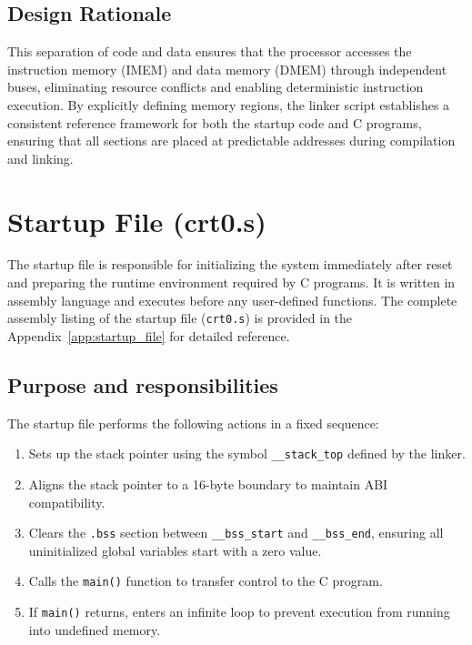 \subsection*{Design Rationale}

This separation of code and data ensures that the processor accesses the instruction memory (IMEM) and data memory (DMEM) through independent buses, eliminating resource conflicts and enabling deterministic instruction execution.  
By explicitly defining memory regions, the linker script establishes a consistent reference framework for both the startup code and C programs, ensuring that all sections are placed at predictable addresses during compilation and linking.


\section{Startup File (crt0.s)}
\label{sec:startup_file}

The startup file is responsible for initializing the system immediately after reset and preparing the runtime environment required by C programs.  
It is written in assembly language and executes before any user-defined functions. The complete assembly listing of the startup file (\texttt{crt0.s}) is provided in the Appendix~\ref{app:startup_file} for detailed reference.


\subsection*{Purpose and responsibilities}

The startup file performs the following actions in a fixed sequence:
\begin{enumerate}
  \item Sets up the stack pointer using the symbol \texttt{\_\_stack\_top} defined by the linker.
  \item Aligns the stack pointer to a 16-byte boundary to maintain ABI compatibility.
  \item Clears the \texttt{.bss} section between \texttt{\_\_bss\_start} and \texttt{\_\_bss\_end}, ensuring all uninitialized global variables start with a zero value.
  \item Calls the \texttt{main()} function to transfer control to the C program.
  \item If \texttt{main()} returns, enters an infinite loop to prevent execution from running into undefined memory.
\end{enumerate}

